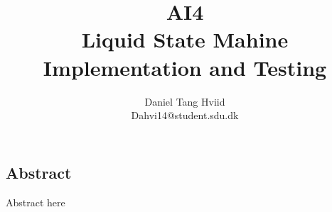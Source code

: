 \documentclass[english,a5paper,oneside, onecolumn,article,9pt]{memoir}
\title{\Huge{AI4} \Large{ \\ Liquid State Mahine \\ Implementation and Testing}}
\author{Daniel Tang Hviid \\ Dahvi14@student.sdu.dk}
\begin{document}
\maketitle
\begin{centering}
\section*{Abstract}
\end{centering}

Abstract here

\tableofcontents
\newpage

\saythanks
{}
















\end{document}
